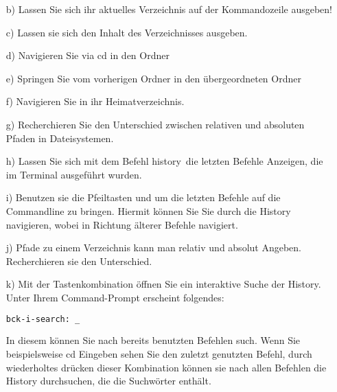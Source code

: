 \documentclass[paper=a4,fontsize=11pt]{scrartcl}%
\numberwithin{equation}{section}
\begin{document}
{\begin{enumerate}
\begin{itemize}
		 Im Verzeichnis Downloads befindet sich nun ein PDF-Dokument, dass die wesentlichen Kommandos für den Umgang mit dem Terminal enthält. Zu jedem Kommando ist eine Kurzbeschreibung vorhanden. Öffnen Sie die Datei im Dateimanager und lösen Sie mit ihrer Hilfe folgende Aufgaben. Es können ein oder mehrere Befehle auf der Kommandozeile auszuführen sein.
		\item[b)] Lassen Sie sich ihr aktuelles Verzeichnis auf der Kommandozeile ausgeben!
		\item[c)] Lassen sie sich den Inhalt des Verzeichnisses ausgeben.
		\item[d)] Navigieren Sie via cd in den Ordner 
		\item[e)] Springen Sie vom vorherigen Ordner in den übergeordneten Ordner
		\item[f)] Navigieren Sie in ihr Heimatverzeichnis.
		\item[g)] Recherchieren Sie den Unterschied zwischen relativen und absoluten Pfaden in Dateisystemen.
		\item[h)] Lassen Sie sich mit dem Befehl \glqq history\grqq\ die letzten Befehle Anzeigen, die im Terminal ausgeführt wurden. 
		\item[i)] Benutzen sie die Pfeiltasten \keys{\arrowkeyup} und \keys{\arrowkeydown} um die letzten Befehle auf die Commandline zu bringen. Hiermit können Sie Sie durch die History navigieren, wobei \keys{\arrowkeyup} in Richtung älterer Befehle navigiert.
		\item[j)] Pfade zu einem Verzeichnis kann man relativ und absolut Angeben. Recherchieren sie den Unterschied.
		\item[k)] Mit der Tastenkombination  öffnen Sie ein interaktive Suche der History. Unter Ihrem Command-Prompt erscheint folgendes:\\
		\begin{lstlisting}[style=Bash, language=Bash]
bck-i-search: _
		\end{lstlisting}
		In diesem können Sie nach bereits benutzten Befehlen such. Wenn Sie beispielsweise cd Eingeben sehen Sie den zuletzt genutzten Befehl, durch wiederholtes drücken dieser Kombination können sie nach allen Befehlen die History durchsuchen, die die Suchwörter enthält.
	\end{itemize}


\end{enumerate}}
\end{document}
